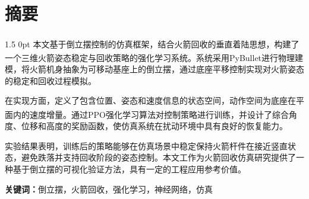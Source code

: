\documentclass[zihao=-4]{ctexart}
\newcommand{\upcite}[1]{\textsuperscript{\cite{#1}}}
\newcommand{\sanhao}{\fontsize{16pt}{0}}
\newcommand{\xiaosi}{\fontsize{12pt}{0}}
\newcommand{\setParDis}{\setlength {\parskip} {0pt} }
\begin{document}
\par \ 
\begin{center}
\sanhao
\centerline{\heiti{}}%
\end{center}



\renewcommand{\headrulewidth}{0pt}%
\clearpage
{} %

\xiaosi
\section*{摘要}
\begin{spacing}{1.5}
  \setParDis %
  本文基于倒立摆\upcite{Spong2005Robot}控制的仿真框架，结合火箭回收的垂直着陆思想，构建了一个三维火箭姿态稳定与回收策略的强化学习系统\upcite{Sutton2018RL}。系统采用PyBullet\upcite{Coumans2016PyBullet}进行物理建模，将火箭机身抽象为可移动基座上的倒立摆，通过底座平移控制实现对火箭姿态的稳定和回收过程模拟。

  在实现方面，定义了包含位置、姿态和速度信息的状态空间，动作空间为底座在平面内的速度增量。通过PPO强化学习算法\upcite{Schulman2017PPO}对控制策略进行训练，并设计了综合角度、位移和高度的奖励函数，使仿真系统在扰动环境中具有良好的恢复能力。

  实验结果表明，训练后的策略能够在仿真场景中稳定保持火箭杆件在接近竖直状态，避免跌落并支持回收阶段的姿态控制。本文工作为火箭回收仿真研究提供了一种基于倒立摆的可视化验证方法，具有一定的工程应用参考价值。
\end{spacing}
    
\textbf{关键词：}倒立摆，火箭回收，强化学习，神经网络，仿真

\newpage
\end{document}
